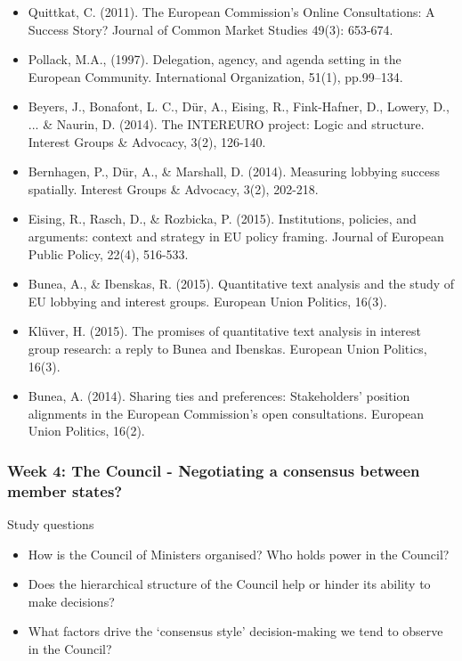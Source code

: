 \begin{itemize}
    \item Quittkat, C. (2011). The European Commission's Online Consultations: A Success Story? Journal of Common Market Studies 49(3): 653-674.
    \item Pollack, M.A., (1997). Delegation, agency, and agenda setting in the European Community. International Organization, 51(1), pp.99–134.
	\item Beyers, J., Bonafont, L. C., D{\"u}r, A., Eising, R., Fink-Hafner, D., Lowery, D., ... \& Naurin, D. (2014). The INTEREURO project: Logic and structure. Interest Groups \& Advocacy, 3(2), 126-140.
	\item Bernhagen, P., D{\"u}r, A., \& Marshall, D. (2014). Measuring lobbying success spatially. Interest Groups \& Advocacy, 3(2), 202-218.
	\item Eising, R., Rasch, D., \& Rozbicka, P. (2015). Institutions, policies, and arguments: context and strategy in EU policy framing. Journal of European Public Policy, 22(4), 516-533.
	\item Bunea, A., \& Ibenskas, R. (2015). Quantitative text analysis and the study of EU lobbying and interest groups. European Union Politics, 16(3).
	\item Kl{\"u}ver, H. (2015). The promises of quantitative text analysis in interest group research: a reply to Bunea and Ibenskas. European Union Politics, 16(3).
	\item Bunea, A. (2014). Sharing ties and preferences: Stakeholders’ position alignments in the European Commission’s open consultations. European Union Politics, 16(2).
\end{itemize}

\subsubsection*{Week 4: The Council - Negotiating a consensus between member states?}

Study questions

\begin{itemize}
	\item How is the Council of Ministers organised? Who holds power in the Council?
	\item Does the hierarchical structure of the Council help or hinder its ability to make decisions?
	\item What factors drive the `consensus style' decision-making we tend to observe in the Council?
\end{itemize}

